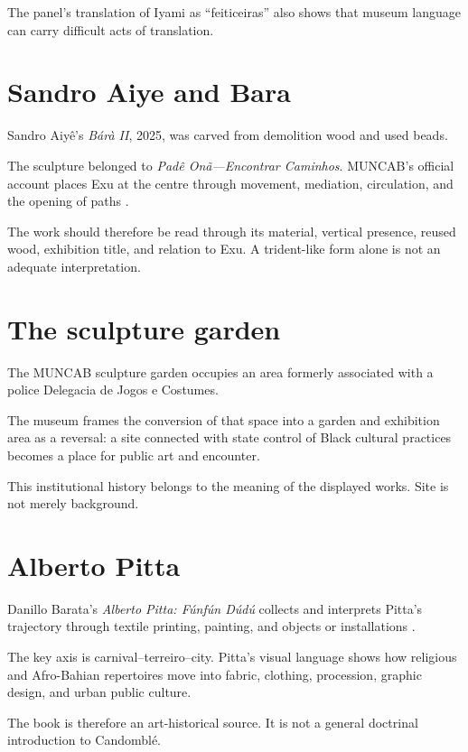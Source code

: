 The panel's translation of Iyami as
``feiticeiras'' also shows that museum
language can carry difficult acts of
translation.

\section{Sandro Aiye and Bara}
\label{section-art-sandro-bara}

Sandro Aiy\^e's
\emph{B\'ar\`a II}, 2025, was carved from
demolition wood and used beads.

The sculpture belonged to
\emph{Pad\^e On\~a---Encontrar Caminhos}.
MUNCAB's official account places Exu at
the centre through movement, mediation,
circulation, and the opening of paths
\cite{muncab2026padeona}.

The work should therefore be read through
its material, vertical presence, reused
wood, exhibition title, and relation to
Exu.  A trident-like form alone is not an
adequate interpretation.

\section{The sculpture garden}
\label{section-muncab-garden}

The MUNCAB sculpture garden occupies an
area formerly associated with a police
Delegacia de Jogos e Costumes.

The museum frames the conversion of that
space into a garden and exhibition area as
a reversal: a site connected with state
control of Black cultural practices becomes
a place for public art and encounter.

This institutional history belongs to the
meaning of the displayed works.  Site is
not merely background.

\section{Alberto Pitta}
\label{section-art-alberto-pitta}

Danillo Barata's
\emph{Alberto Pitta: F\'unf\'un D\'ud\'u}
collects and interprets Pitta's trajectory
through textile printing, painting, and
objects or installations
\cite{barata2025pitta}.

The key axis is carnival--terreiro--city.
Pitta's visual language shows how religious
and Afro-Bahian repertoires move into
fabric, clothing, procession, graphic
design, and urban public culture.

The book is therefore an art-historical
source.  It is not a general doctrinal
introduction to Candombl\'e.

